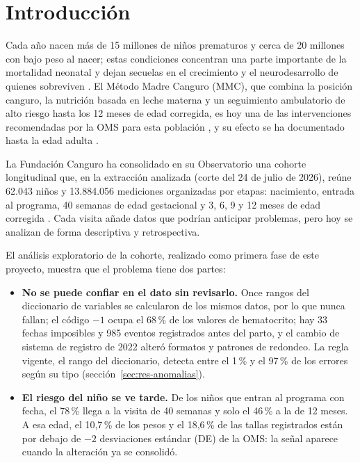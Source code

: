 \section{Introducción}
\label{sec:introduccion}

Cada año nacen más de 15 millones de niños prematuros y cerca de 20 millones con bajo peso al nacer; estas condiciones concentran una parte importante de la mortalidad neonatal y dejan secuelas en el crecimiento y el neurodesarrollo de quienes sobreviven \cite{oms2022,victora2021,fundacion2026}. El Método Madre Canguro (MMC), que combina la posición canguro, la nutrición basada en leche materna y un seguimiento ambulatorio de alto riesgo hasta los 12 meses de edad corregida, es hoy una de las intervenciones recomendadas por la OMS para esta población \cite{oms2022}, y su efecto se ha documentado hasta la edad adulta \cite{charpak2017}.

La Fundación Canguro ha consolidado en su Observatorio una cohorte longitudinal que, en la extracción analizada (corte del 24 de julio de 2026), reúne 62.043 niños y 13.884.056 mediciones organizadas por etapas: nacimiento, entrada al programa, 40 semanas de edad gestacional y 3, 6, 9 y 12 meses de edad corregida \cite{fundacion2026,charpak2023}. Cada visita añade datos que podrían anticipar problemas, pero hoy se analizan de forma descriptiva y retrospectiva.

El análisis exploratorio de la cohorte, realizado como primera fase de este proyecto, muestra que el problema tiene dos partes:

\begin{itemize}
\item \textbf{No se puede confiar en el dato sin revisarlo.} Once rangos del diccionario de variables se calcularon de los mismos datos, por lo que nunca fallan; el código $-1$ ocupa el 68\,\% de los valores de hematocrito; hay 33 fechas imposibles y 985 eventos registrados antes del parto, y el cambio de sistema de registro de 2022 alteró formatos y patrones de redondeo. La regla vigente, el rango del diccionario, detecta entre el 1\,\% y el 97\,\% de los errores según su tipo (sección~\ref{sec:res-anomalias}).
\item \textbf{El riesgo del niño se ve tarde.} De los niños que entran al programa con fecha, el 78\,\% llega a la visita de 40 semanas y solo el 46\,\% a la de 12 meses. A esa edad, el 10,7\,\% de los pesos y el 18,6\,\% de las tallas registrados están por debajo de $-2$ desviaciones estándar (DE) de la OMS: la señal aparece cuando la alteración ya se consolidó.
\end{itemize}

